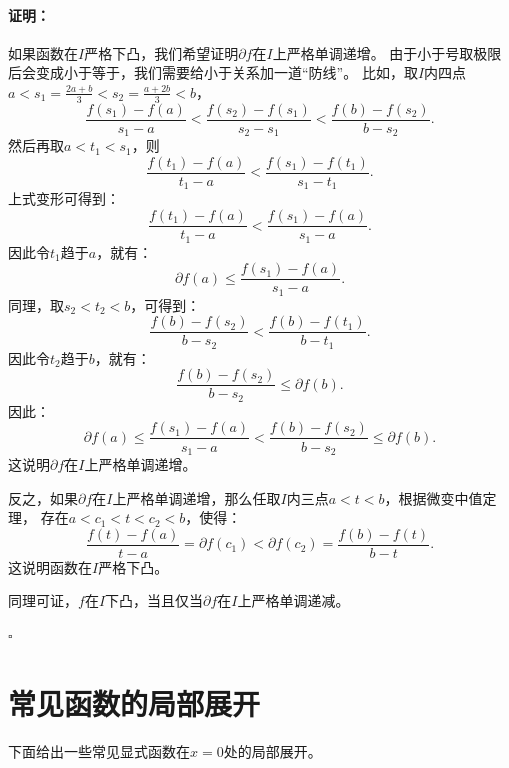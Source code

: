 \documentclass[12pt,UTF8]{ctexbook}
\theoremstyle{definition}
\theoremstyle{plain}
\renewenvironment{proof}{\paragraph{\textbf{证明：}}}{\hfill$\square$}
\begin{document}
\begin{appendix}
\begin{proof}
    如果函数在$I$严格下凸，我们希望证明$\partial f$在$I$上严格单调递增。
    由于小于号取极限后会变成小于等于，我们需要给小于关系加一道“防线”。
    比如，取$I$内四点$a < s_1 = \frac{2a + b}{3} < s_2 = \frac{a + 2b}{3} < b$，
    $$ \frac{f(s_1) - f(a)}{s_1 - a} < \frac{f(s_2) - f(s_1)}{s_2 - s_1} < \frac{f(b) - f(s_2)}{b - s_2}. $$
    然后再取$a < t_1 < s_1$，则
    $$ \frac{f(t_1) - f(a)}{t_1 - a} < \frac{f(s_1) - f(t_1)}{s_1 - t_1}. $$
    上式变形可得到：
    $$ \frac{f(t_1) - f(a)}{t_1 - a} < \frac{f(s_1) - f(a)}{s_1 - a}. $$
    因此令$t_1$趋于$a$，就有：
    $$ \partial f(a) \leqslant \frac{f(s_1) - f(a)}{s_1 - a}.$$
    同理，取$s_2 < t_2 < b$，可得到：
    $$ \frac{f(b) - f(s_2)}{b - s_2} < \frac{f(b) - f(t_1)}{b - t_1}. $$
    因此令$t_2$趋于$b$，就有：
    $$ \frac{f(b) - f(s_2)}{b - s_2} \leqslant \partial f(b).$$
    因此：
    $$ \partial f(a) \leqslant \frac{f(s_1) - f(a)}{s_1 - a} < \frac{f(b) - f(s_2)}{b - s_2} \leqslant \partial f(b).$$
    这说明$\partial f$在$I$上严格单调递增。
    
    反之，如果$\partial f$在$I$上严格单调递增，那么任取$I$内三点$a < t < b$，根据微变中值定理，
    存在$a < c_1 < t < c_2 < b$，使得：
    $$ \frac{f(t) - f(a)}{t - a} = \partial f(c_1) < \partial f(c_2) = \frac{f(b) - f(t)}{b - t}. $$
    这说明函数在$I$严格下凸。

    同理可证，$f$在$I$下凸，当且仅当$\partial f$在$I$上严格单调递减。

\end{proof}

\section{常见函数的局部展开}

下面给出一些常见显式函数在$x = 0$处的局部展开。


\end{appendix}
\end{document}
